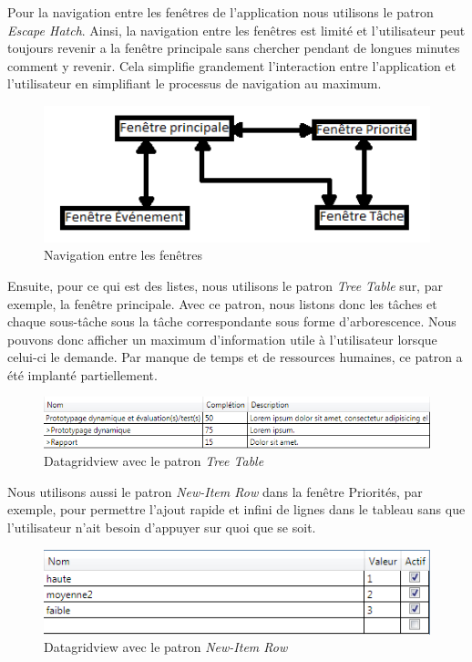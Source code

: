 \documentclass[letterpaper, oneside, 12pt, these, creativecommons]{thETS}
\begin{document}
Pour la navigation entre les fenêtres de l'application nous utilisons le patron \emph{Escape Hatch}. Ainsi, la navigation entre les fenêtres est limité et l'utilisateur peut toujours revenir a la fenêtre principale sans chercher pendant de longues minutes comment y revenir. Cela simplifie grandement l'interaction entre l'application et l'utilisateur en simplifiant le processus de navigation au maximum.

\begin{figure}[H!]
	\centering
	\includegraphics[width=1\textwidth]{navigation.png}
	\caption{Navigation entre les fenêtres}
\end{figure}

\newpage

Ensuite, pour ce qui est des listes, nous utilisons le patron \emph{Tree Table} sur, par exemple, la fenêtre principale. Avec ce patron, nous listons donc les tâches et chaque sous-tâche sous la tâche correspondante sous forme d'arborescence. Nous pouvons donc afficher un maximum d'information utile à l'utilisateur lorsque celui-ci le demande. Par manque de temps et de ressources humaines, ce patron a été implanté partiellement.

\begin{figure}[H!]
	\centering
	\includegraphics[width=1\textwidth]{tree_table.png}
	\caption{Datagridview avec le patron \emph{Tree Table}}
\end{figure}

Nous utilisons aussi le patron \emph{New-Item Row} dans la fenêtre Priorités, par exemple, pour permettre l'ajout rapide et infini de lignes dans le tableau sans que l'utilisateur n'ait besoin d'appuyer sur quoi que se soit. 

\begin{figure}[H!]
	\centering
	\includegraphics[width=1\textwidth]{new_item_row.png}
	\caption{Datagridview avec le patron \emph{New-Item Row}}
\end{figure}
\end{document}
